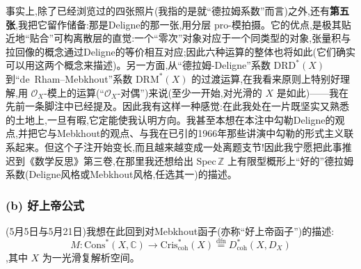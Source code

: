 \noindent 事实上,除了已经浏览过的四张照片(我指的是就“德拉姆系数”而言)之外,还有\textbf{第五张},我把它留作储备:那是Deligne的那一张,用分层 pro-模拍摄。它的优点,是极其贴近地“贴合”可构离散层的直觉:一个“零次”对象对应于一个同类型的对象,张量积与拉回像的概念通过Deligne的等价相互对应;因此六种运算的整体也将如此(它们确实可以用这两个概念来描述)。另一方面,从“德拉姆-Deligne”系数 $\mathrm{DRD}^{*}(X)$ 到“de~Rham--Mebkhout”系数 $\mathrm{DRM}^{*}(X)$ 的过渡运算,在我看来原则上特别好理解,用 $\mathcal{O}_{X}$-模上的运算(“$\mathcal{O}_{X}$-对偶”)来说(至少一开始,对光滑的 $X$ 是如此)——我在先前一条脚注中已经提及。因此我有这样一种感觉:在此我处在一片既坚实又熟悉的土地上,一旦有暇,它定能使我认明方向。我甚至本想在本注中\dmark{}勾勒Deligne的观点,并把它与Mebkhout的观点、与我在已引的1966年那些讲演中勾勒的形式主义联系起来。但这个子注开始变长,而且越来越变成一处离题支节!因此我宁愿把此事推迟到《数学反思》第三卷,在那里我还想给出 $\mathrm{Spec}\,\mathbb{Z}$ 上有限型概形上“好的”德拉姆系数(Deligne风格或Mebkhout风格,任选其一)的描述。

\subsubsection*{(b) 好上帝公式}


\noindent (5月5日与5月21日)我想在此回到对Mebkhout函子(亦称“好上帝函子”)的描述:
\begin{equation*}
M : \mathrm{Cons}^{*}(X,\mathbb{C})\longrightarrow \mathrm{Cris}^{*}_{\mathrm{coh}}(X)\overset{\mathrm{dfn}}{=}D^{*}_{\mathrm{coh}}(X,D_{X})
\tag{1}
\end{equation*}
,其中 $X$ 为一光滑复解析空间。

